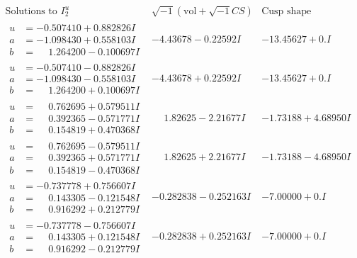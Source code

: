 \documentclass[1p]{elsarticle_modified}
\theoremstyle{definition}
\newcommand{\I}{\sqrt{-1}}
\begin{document}
$$\begin{array}{c|c|c}  
\text{Solutions to }I^u_{2}& \I (\text{vol} + \sqrt{-1}CS) & \text{Cusp shape}\\
 \hline 
\begin{aligned}
u &= -0.507410 + 0.882826 I \\
a &= -1.098430 + 0.558103 I \\
b &= \phantom{-}1.264200 - 0.100697 I\end{aligned}
 & -4.43678 - 0.22592 I & -13.45627 + 0. I\phantom{ +0.000000I} \\ \hline\begin{aligned}
u &= -0.507410 - 0.882826 I \\
a &= -1.098430 - 0.558103 I \\
b &= \phantom{-}1.264200 + 0.100697 I\end{aligned}
 & -4.43678 + 0.22592 I & -13.45627 + 0. I\phantom{ +0.000000I} \\ \hline\begin{aligned}
u &= \phantom{-}0.762695 + 0.579511 I \\
a &= \phantom{-}0.392365 - 0.571771 I \\
b &= \phantom{-}0.154819 + 0.470368 I\end{aligned}
 & \phantom{-}1.82625 - 2.21677 I & -1.73188 + 4.68950 I \\ \hline\begin{aligned}
u &= \phantom{-}0.762695 - 0.579511 I \\
a &= \phantom{-}0.392365 + 0.571771 I \\
b &= \phantom{-}0.154819 - 0.470368 I\end{aligned}
 & \phantom{-}1.82625 + 2.21677 I & -1.73188 - 4.68950 I \\ \hline\begin{aligned}
u &= -0.737778 + 0.756607 I \\
a &= \phantom{-}0.143305 - 0.121548 I \\
b &= \phantom{-}0.916292 + 0.212779 I\end{aligned}
 & -0.282838 - 0.252163 I & -7.00000 + 0. I\phantom{ +0.000000I} \\ \hline\begin{aligned}
u &= -0.737778 - 0.756607 I \\
a &= \phantom{-}0.143305 + 0.121548 I \\
b &= \phantom{-}0.916292 - 0.212779 I\end{aligned}
 & -0.282838 + 0.252163 I & -7.00000 + 0. I\phantom{ +0.000000I} \\ \hline\begin{aligned}

\end{aligned}
\end{array}$$
\end{document}
